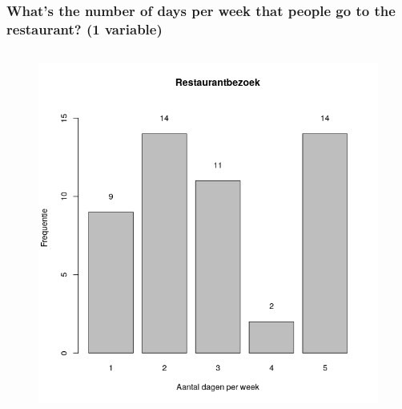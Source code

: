 \documentclass{beamer}
\begin{document}
\begin{frame}
\begin{columns}
\begin{column}{0.5\textwidth}
    \end{column}
  \end{columns}
\end{frame}

\begin{frame}
  \frametitle{What's the number of days per week that people go to the restaurant? (1 variable)}
  \begin{columns}
    
    \begin{column}{0.5\textwidth}
      \begin{figure}
        \centering
        \includegraphics[width=1.00\textwidth]{img/2var-barplot-aantalbezoeken}
      \end{figure}
    \end{column}
  

\end{columns}
\end{frame}
\end{document}

